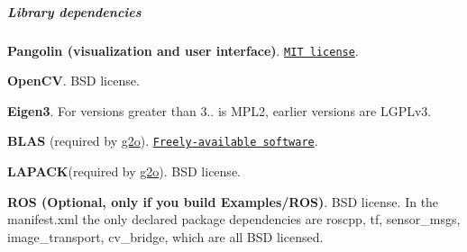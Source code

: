 \subparagraph*{Library dependencies}


\begin{DoxyItemize}
\item {\bfseries Pangolin (visualization and user interface)}. \href{https://en.wikipedia.org/wiki/MIT_License}{\tt M\+IT license}.
\item {\bfseries Open\+CV}. B\+SD license.
\item {\bfseries Eigen3}. For versions greater than 3.. is M\+P\+L2, earlier versions are L\+G\+P\+Lv3.
\item {\bfseries B\+L\+AS} (required by \mbox{\hyperlink{namespaceg2o}{g2o}}). \href{http://www.netlib.org/blas/#_licensing}{\tt Freely-\/available software}.
\item {\bfseries L\+A\+P\+A\+CK}(required by \mbox{\hyperlink{namespaceg2o}{g2o}}). B\+SD license.
\item {\bfseries R\+OS (Optional, only if you build Examples/\+R\+OS)}. B\+SD license. In the manifest.\+xml the only declared package dependencies are roscpp, tf, sensor\+\_\+msgs, image\+\_\+transport, cv\+\_\+bridge, which are all B\+SD licensed. 
\end{DoxyItemize}